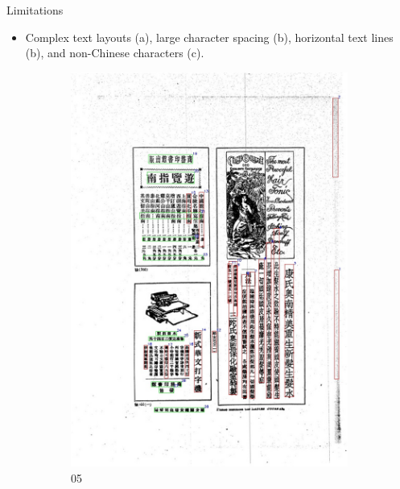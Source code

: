 \documentclass{beamer}
\begin{document}
\begin{frame}
    \begin{center}
        \Large{Limitations}
    \end{center}
    \begin{itemize}
        \item Complex text layouts (a), large character spacing (b), horizontal text lines (b), and non-Chinese characters (c).
    \end{itemize}
    \begin{figure}[htbp]
        \centering
        \begin{subfigure}[b]{0.3\linewidth}
            \includegraphics[height=1.35\linewidth]{./figures/samples/05.jpg}
            \caption{05}
            \label{fig:ours_05}
        \end{subfigure}
        \hfill
        \begin{subfigure}[b]{0.3\linewidth}

\end{subfigure}
\end{figure}
\end{frame}
\end{document}
